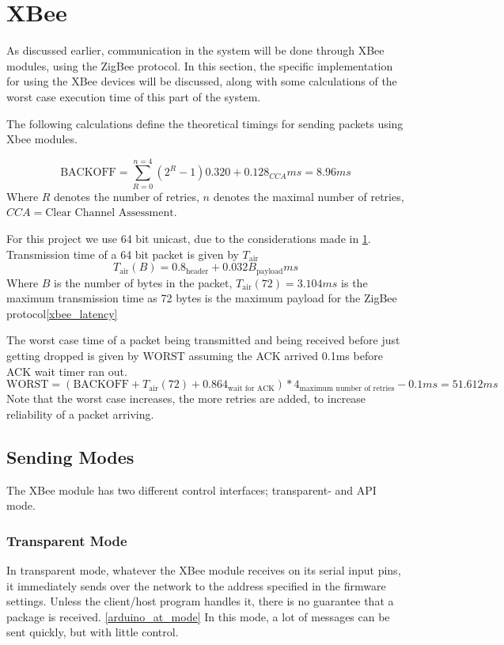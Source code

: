 \section{XBee}\label{sec:xbee}
As discussed earlier, communication in the system will be done through XBee modules, using the ZigBee protocol. In this section, the specific implementation for using the XBee devices will be discussed, along with some calculations of the worst case execution time of this part of the system.

The following calculations define the theoretical timings for sending packets using Xbee modules.

\begin{equation*}
\text{BACKOFF} = \sum\limits_{R=0}^{n=4}(2^{R} - 1) 0.320 + 0.128_{CCA} ms = 8.96 ms
\end{equation*}
Where $R$ denotes the number of retries, $n$ denotes the maximal number of retries, $CCA = \text{Clear Channel Assessment}$.

For this project we use 64 bit unicast, due to the considerations made in \cref{sec:xbee}.
Transmission time of a 64 bit packet is given by $T_{\text{air}}$
\begin{equation*}
T_{\text{air}}(B) = 0.8_{\text{header}} + 0.032B_{\text{payload}} ms
\end{equation*}
Where $B$ is the number of bytes in the packet, $T_{\text{air}}(72) = 3.104 ms$ is the maximum transmission time as 72 bytes is the maximum payload for the ZigBee protocol\cref{xbee_latency}

The worst case time of a packet being transmitted and being received before just getting dropped is given by $\text{WORST}$ assuming the ACK arrived 0.1ms before ACK wait timer ran out.
\begin{equation*}
\text{WORST} = (\text{BACKOFF} + T_{\text{air}}(72) + 0.864_{\text{wait for ACK}})*4_{\text{maximum number of retries}} - 0.1 ms = 51.612 ms
\end{equation*}
Note that the worst case increases, the more retries are added, to increase reliability of a packet arriving.

\subsection{Sending Modes}
The XBee module has two different control interfaces; transparent- and API mode.
\subsubsection{Transparent Mode}
In transparent mode, whatever the XBee module receives on its serial input pins, it immediately sends over the network to the address specified in the firmware settings. Unless the client/host program handles it, there is no guarantee that a package is received. \cref{arduino_at_mode}
In this mode, a lot of messages can be sent quickly, but with little control.
